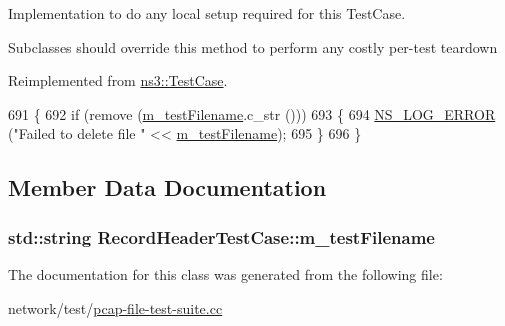 Implementation to do any local setup required for this Test\+Case. 

Subclasses should override this method to perform any costly per-\/test teardown 

Reimplemented from \hyperlink{classns3_1_1TestCase_a8917f1604e28d312a8086f76291e3c46}{ns3\+::\+Test\+Case}.


\begin{DoxyCode}
691 \{
692   \textcolor{keywordflow}{if} (\textcolor{keyword}{remove} (\hyperlink{classRecordHeaderTestCase_a120cda070e5262333c795ce77359528e}{m\_testFilename}.c\_str ()))
693     \{
694       \hyperlink{group__logging_ga0261a8db1d4ac5f79417d117634fd455}{NS\_LOG\_ERROR} (\textcolor{stringliteral}{"Failed to delete file "} << \hyperlink{classRecordHeaderTestCase_a120cda070e5262333c795ce77359528e}{m\_testFilename});
695     \}
696 \}
\end{DoxyCode}


\subsection{Member Data Documentation}
\subsubsection[{\texorpdfstring{m\+\_\+test\+Filename}{m_testFilename}}]{\setlength{\rightskip}{0pt plus 5cm}std\+::string Record\+Header\+Test\+Case\+::m\+\_\+test\+Filename\hspace{0.3cm}{\ttfamily [private]}}\hypertarget{classRecordHeaderTestCase_a120cda070e5262333c795ce77359528e}{}\label{classRecordHeaderTestCase_a120cda070e5262333c795ce77359528e}


The documentation for this class was generated from the following file\+:\begin{DoxyCompactItemize}
\item 
network/test/\hyperlink{pcap-file-test-suite_8cc}{pcap-\/file-\/test-\/suite.\+cc}\end{DoxyCompactItemize}
